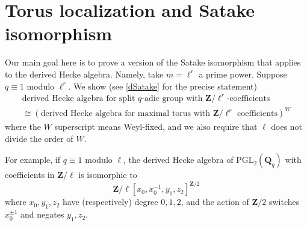 \documentclass[10pt]{amsart}
\newcommand{\Z}{\mathbf{Z}}
\newcommand{\gHecke}{\tilde{\mathbb{T}}}
\newcommand{\Q}{\mathbf{Q}}
\newcommand{\PGL}{\mathrm{PGL}}
\theoremstyle{remark}
\begin{document}

%
%
%
%
%
%
%
%

%
%
%
%
 
   
%
%
%
%
%
%
%
%
%
%
%
%
%
%
%
%
%
%
%
%
%
%
%
%
%
%
%
%
%
%
%
%
%
%
%
%
%

  \section{Torus localization and Satake isomorphism} \label{Satake} 
  
   Our main goal here is to prove a version of the Satake isomorphism that applies to the derived Hecke algebra. Namely, 
take $m =\ell^r$  a prime power.   Suppose $q \equiv 1$ modulo $\ell^r$. We show  
   (see \eqref{dSatake} for the precise statement) 
\begin{eqnarray*} \mbox{derived Hecke algebra for  split $q$-adic group with $\Z/\ell^r$-coefficients} \\  \cong  \left(\mbox{derived Hecke algebra for maximal torus with $\Z/\ell^r$ coefficients}\right)^{W} \end{eqnarray*}
where the $W$ superscript means Weyl-fixed, and we also require that $\ell$ does not divide the order of $W$. 

For example,   if $q \equiv 1$ modulo $\ell$, the derived Hecke algebra of $\PGL_2(\Q_q)$ with coefficients in $\Z/\ell$  is isomorphic to 
   $$ \Z/\ell[x_0, x_0^{-1},  y_1, z_2]^{\Z/2}$$
  where $x_0, y_1, z_2$ have (respectively) degree $0,1,2$, and the action of $\Z/2$ switches $x_0^{\pm 1}$ and negates $y_1, z_2$. 
    
\end{document}
